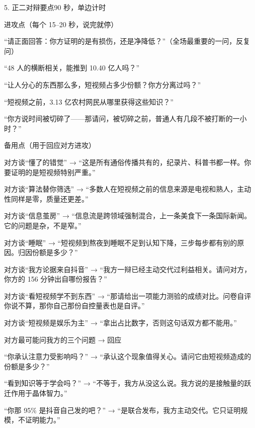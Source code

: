 \documentclass[script,pro]{debate}
\begin{document}
\begin{stage}{5. 正二对辩要点}{90 秒，单边计时}
\begin{points}{进攻点（每个 15–20 秒，说完就停）}
\item “请正面回答：你方证明的是有损伤，还是净降低？”（全场最重要的一问，反复问）
\item “48 人的横断相关，能推到 10.40 亿人吗？”
\item “让人分心的东西那么多，短视频占多少份额？你方分离过吗？”
\item “短视频之前，3.13 亿农村网民从哪里获得这些知识？”
\item “你方说时间被切碎了——那请问，被切碎之前，普通人有几段不被打断的一小时？”
\end{points}
\begin{points}{备用点（用于回应对方进攻）}
\item 对方谈“懂了的错觉” → “这是所有通俗传播共有的，纪录片、科普书都一样。你要证明的是短视频特别严重。”
\item 对方谈“算法替你筛选” → “多数人在短视频之前的信息来源是电视和熟人，主动性同样是零，质量还更差。”
\item 对方谈“信息茧房” → “信息流是跨领域强制混合，上一条美食下一条国际新闻。它的问题是杂，不是窄。”
\item 对方谈“睡眠” → “短视频到熬夜到睡眠不足到认知下降，三步每步都有别的原因。归因份额是多少？”
\item 对方谈“我方论据来自抖音” → “我方一辩已经主动交代过利益相关。请问对方，你方的 156 分钟出自哪份报告？”
\item 对方谈“看短视频学不到东西” → “那请给出一项能力测验的成绩对比。问卷自评你说不算，那你自己那份自控量表也是自评。”
\item 对方谈“短视频是娱乐为主” → “拿出占比数字，否则这句话双方都不能用。”
\end{points}
\begin{points}{对方最可能问我方的三个问题 → 回应}
\item “你承认注意力受影响吗？” → “承认这个现象值得关心。请问它由短视频造成的份额是多少？”
\item “看到知识等于学会吗？” → “不等于，我方从没这么说。我方说的是接触量的跃迁作用于晶体智力。”
\item “你那 95\% 是抖音自己发的吧？” → “是联合发布，我方主动交代。它只证明规模，不证明能力。”
\end{points}
\end{stage}
\end{document}
